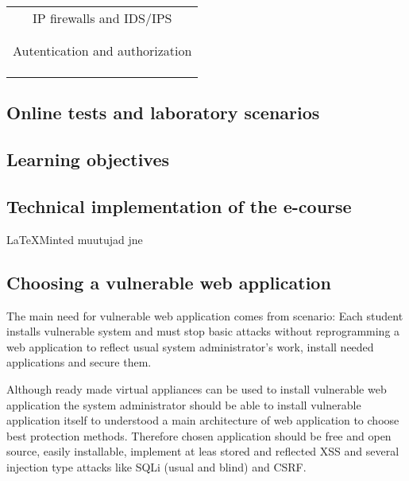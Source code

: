 \begin{table}[H]
\begin{tabular}{|p{5cm}|p{3cm}|p{6cm}|}
\hline
 & & \\

\hline
\hline
  \multicolumn{3}{|c|}{IP firewalls and IDS/IPS} \\
\hline 
 & & \\
\hline

\hline
 & & \\

\hline
\hline
  \multicolumn{3}{|c|}{Autentication and authorization} \\
\hline 
 & & \\
\hline

\hline
 & & \\

\hline
 & & \\
\hline
\end{tabular} 
\label{table:learning_materials}
\end{table}



\subsection{Online tests and laboratory scenarios}

\subsection{Learning objectives}

\subsection{Technical implementation of the e-course}

\LaTeX Minted muutujad jne

\subsection{Choosing a vulnerable web application}

The main need for vulnerable web application comes from scenario: Each student installs vulnerable system and must stop basic attacks without reprogramming a web application to reflect usual system administrator's work,  install needed applications and secure them.

Although ready made virtual appliances can be used to install vulnerable web application the
system administrator should be able to install vulnerable application itself to understood a main architecture of web application to choose best protection methods. Therefore chosen application should be free and open source, easily installable, implement at leas stored and reflected \gls{XSS} and several injection type attacks like \gls{SQLi} (usual and blind) and \gls{CSRF}.

